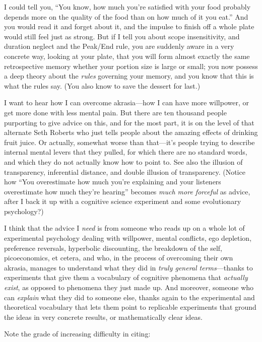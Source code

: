 {
 I could tell you, ``You know, how much
you're satisfied with your food probably depends more
on the quality of the food than on how much of it you
eat.'' And you would read it and forget about it, and
the impulse to finish off a whole plate would still feel just as
strong. But if I tell you about scope insensitivity, and duration
neglect and the Peak/End rule, you are suddenly aware in a very
concrete way, looking at your plate, that you will form almost exactly
the same retrospective memory whether your portion size is large or
small; you now possess a deep theory about the \textit{rules} governing
your memory, and you know that this is what the rules say. (You also
know to save the dessert for last.)}

{
 I want to hear how I can overcome akrasia---how I can have more
willpower, or get more done with less mental pain. But there are ten
thousand people purporting to give advice on this, and for the most
part, it is on the level of that alternate Seth Roberts who just tells
people about the amazing effects of drinking fruit juice. Or actually,
somewhat worse than that---it's people trying to
describe internal mental levers that they pulled, for which there are
no standard words, and which they do not actually know how to point to.
See also the illusion of transparency, inferential distance, and double
illusion of transparency. (Notice how ``You
overestimate how much you're explaining and your
listeners overestimate how much they're
hearing'' becomes \textit{much more forceful} as
advice, after I back it up with a cognitive science experiment and some
evolutionary psychology?)}

{
 I think that the advice I \textit{need} is from someone who reads
up on a whole lot of experimental psychology dealing with willpower,
mental conflicts, ego depletion, preference reversals, hyperbolic
discounting, the breakdown of the self, picoeconomics, et cetera, and
who, in the process of overcoming their own akrasia, manages to
understand what they did in \textit{truly general terms}{}---thanks to
experiments that give them a vocabulary of cognitive phenomena that
\textit{actually exist}, as opposed to phenomena they just made up. And
moreover, someone who can \textit{explain} what they did to someone
else, thanks again to the experimental and theoretical vocabulary that
lets them point to replicable experiments that ground the ideas in very
concrete results, or mathematically clear ideas.}

{
 Note the grade of increasing difficulty in citing:}

